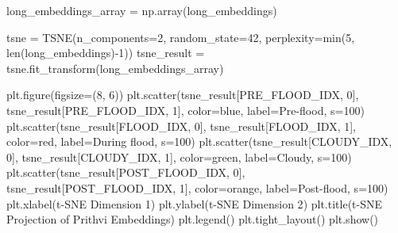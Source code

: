 \documentclass[
  letterpaper,
  DIV=11,
  numbers=noendperiod]{scrreprt}
\newenvironment{Shaded}{\begin{snugshade}}{\end{snugshade}}
\newcommand{\BuiltInTok}[1]{\textcolor[rgb]{0.00,0.23,0.31}{#1}}
\newcommand{\DecValTok}[1]{\textcolor[rgb]{0.68,0.00,0.00}{#1}}
\newcommand{\NormalTok}[1]{\textcolor[rgb]{0.00,0.23,0.31}{#1}}
\newcommand{\OperatorTok}[1]{\textcolor[rgb]{0.37,0.37,0.37}{#1}}
\newcommand{\StringTok}[1]{\textcolor[rgb]{0.13,0.47,0.30}{#1}}
\begin{document}
\begin{Shaded}
\begin{Highlighting}[]
\NormalTok{long\_embeddings\_array }\OperatorTok{=}\NormalTok{ np.array(long\_embeddings)}

\NormalTok{tsne }\OperatorTok{=}\NormalTok{ TSNE(n\_components}\OperatorTok{=}\DecValTok{2}\NormalTok{, random\_state}\OperatorTok{=}\DecValTok{42}\NormalTok{, perplexity}\OperatorTok{=}\BuiltInTok{min}\NormalTok{(}\DecValTok{5}\NormalTok{, }\BuiltInTok{len}\NormalTok{(long\_embeddings)}\OperatorTok{{-}}\DecValTok{1}\NormalTok{))}
\NormalTok{tsne\_result }\OperatorTok{=}\NormalTok{ tsne.fit\_transform(long\_embeddings\_array)}

\NormalTok{plt.figure(figsize}\OperatorTok{=}\NormalTok{(}\DecValTok{8}\NormalTok{, }\DecValTok{6}\NormalTok{))}
\NormalTok{plt.scatter(tsne\_result[PRE\_FLOOD\_IDX, }\DecValTok{0}\NormalTok{], tsne\_result[PRE\_FLOOD\_IDX, }\DecValTok{1}\NormalTok{], color}\OperatorTok{=}\StringTok{\textquotesingle{}blue\textquotesingle{}}\NormalTok{, label}\OperatorTok{=}\StringTok{\textquotesingle{}Pre{-}flood\textquotesingle{}}\NormalTok{, s}\OperatorTok{=}\DecValTok{100}\NormalTok{)}
\NormalTok{plt.scatter(tsne\_result[FLOOD\_IDX, }\DecValTok{0}\NormalTok{], tsne\_result[FLOOD\_IDX, }\DecValTok{1}\NormalTok{], color}\OperatorTok{=}\StringTok{\textquotesingle{}red\textquotesingle{}}\NormalTok{, label}\OperatorTok{=}\StringTok{\textquotesingle{}During flood\textquotesingle{}}\NormalTok{, s}\OperatorTok{=}\DecValTok{100}\NormalTok{)}
\NormalTok{plt.scatter(tsne\_result[CLOUDY\_IDX, }\DecValTok{0}\NormalTok{], tsne\_result[CLOUDY\_IDX, }\DecValTok{1}\NormalTok{], color}\OperatorTok{=}\StringTok{\textquotesingle{}green\textquotesingle{}}\NormalTok{, label}\OperatorTok{=}\StringTok{\textquotesingle{}Cloudy\textquotesingle{}}\NormalTok{, s}\OperatorTok{=}\DecValTok{100}\NormalTok{)}
\NormalTok{plt.scatter(tsne\_result[POST\_FLOOD\_IDX, }\DecValTok{0}\NormalTok{], tsne\_result[POST\_FLOOD\_IDX, }\DecValTok{1}\NormalTok{], color}\OperatorTok{=}\StringTok{\textquotesingle{}orange\textquotesingle{}}\NormalTok{, label}\OperatorTok{=}\StringTok{\textquotesingle{}Post{-}flood\textquotesingle{}}\NormalTok{, s}\OperatorTok{=}\DecValTok{100}\NormalTok{)}
\NormalTok{plt.xlabel(}\StringTok{\textquotesingle{}t{-}SNE Dimension 1\textquotesingle{}}\NormalTok{)}
\NormalTok{plt.ylabel(}\StringTok{\textquotesingle{}t{-}SNE Dimension 2\textquotesingle{}}\NormalTok{)}
\NormalTok{plt.title(}\StringTok{\textquotesingle{}t{-}SNE Projection of Prithvi Embeddings\textquotesingle{}}\NormalTok{)}
\NormalTok{plt.legend()}
\NormalTok{plt.tight\_layout()}
\NormalTok{plt.show()}
\end{Highlighting}
\end{Shaded}
\end{document}
